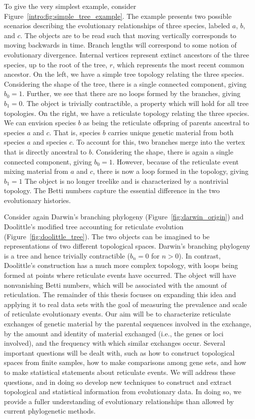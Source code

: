 To give the very simplest example, consider Figure~\ref{intro:fig:simple_tree_example}.
The example presents two possible scenarios describing the evolutionary relationships of three species, labeled $a$, $b$, and $c$.
The objects are to be read such that moving vertically corresponds to moving backwards in time.
Branch lengths will correspond to some notion of evolutionary divergence.
Internal vertices represent extinct ancestors of the three species, up to the root of the tree, $r$, which represents the most recent common ancestor.
On the left, we have a simple tree topology relating the three species.
Considering the shape of the tree, there is a single connected component, giving $b_0=1$.
Further, we see that there are no loops formed by the branches, giving $b_1=0$.
The object is trivially contractible, a property which will hold for all tree topologies.
On the right, we have a reticulate topology relating the three species.
We can envision species $b$ as being the reticulate offspring of parents ancestral to species $a$ and $c$.
That is, species $b$ carries unique genetic material from both species $a$ and species $c$.
To account for this, two branches merge into the vertex that is directly ancestral to $b$.
Considering the shape, there is again a single connected component, giving $b_0=1$.
However, because of the reticulate event mixing material from $a$ and $c$, there is now a loop formed in the topology, giving $b_1=1$
The object is no longer treelike and is characterized by a nontrivial topology.
The Betti numbers capture the essential difference in the two evolutionary histories.

Consider again Darwin's branching phylogeny (Figure~\ref{fig:darwin_origin}) and Doolittle's modified tree accounting for reticulate evolution (Figure~\ref{fig:doolittle_tree}).
The two objects can be imagined to be representations of two different topological spaces.
Darwin's branching phylogeny is a tree and hence trivially contractible ($b_n=0$ for $n>0$).
In contrast, Doolittle's construction has a much more complex topology, with loops being formed at points where reticulate events have occurred.
The object will have nonvanishing Betti numbers, which will be associated with the amount of reticulation.
The remainder of this thesis focuses on expanding this idea and applying it to real data sets with the goal of measuring the prevalence and scale of reticulate evolutionary events.
Our aim will be to characterize reticulate exchanges of genetic material by the parental sequences involved in the exchange, by the amount and identity of material exchanged (i.e., the genes or loci involved), and the frequency with which similar exchanges occur.
Several important questions will be dealt with, such as how to construct topological spaces from finite samples, how to make comparisons among gene sets, and how to make statistical statements about reticulate events.
We will address these questions, and in doing so develop new techniques to construct and extract topological and statistical information from evolutionary data.
In doing so, we provide a fuller understanding of evolutionary relationships than allowed by current phylogenetic methods.


